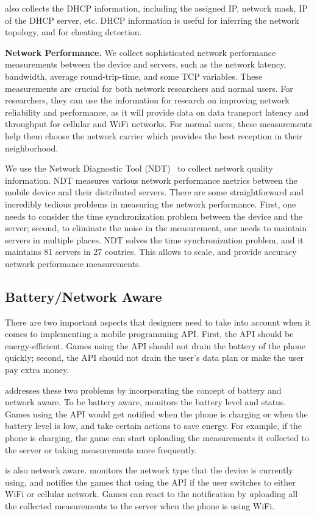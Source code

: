 \name{} also collects the DHCP information, including the assigned IP, network mask, IP of the DHCP server, etc.
DHCP information is useful for inferring the network topology, and for cheating detection.
 
 
{\bfseries Network Performance.} We collect sophisticated network performance measurements between the device
and servers, such as the network latency, bandwidth, average round-trip-time, and some TCP variables. These
measurements are crucial for both network researchers and normal users. For researchers, they can use the 
information for research on improving network reliability and performance, as it will provide data on data 
transport latency and throughput for cellular and WiFi networks. For normal users, these measurements help them
choose the network carrier which provides the best reception in their neighborhood. 

We use the Network Diagnostic Tool (NDT)~\cite{NDT} to collect network quality information. NDT measures various network 
performance metrics between the mobile device and their distributed servers. There are some straightforward 
and incredibly tedious problems in measuring the network performance. First, one needs to consider the time 
synchronization problem between the device and the server; second, to eliminate the noise in the measurement, 
one needs to maintain servers in multiple places. 
NDT solves the time synchronization problem, and it maintains 81 servers in 27 coutries. This allows \name{}
to scale, and provide accuracy network performance measurements.

\subsection{Battery/Network Aware}
There are two important aspects that designers need to take into account when it comes to 
implementing a mobile programming API. First, the API should be energy-efficient. 
Games using the API should not drain the battery of the phone quickly; second, the API should
not drain the user's data plan or make the user pay extra money. 
 
\name{} addresses these two problems by incorporating the concept of battery and network aware. 
To be battery aware, \name{} monitors the battery level and status. Games using the API would get
notified when the phone is charging or when the battery level is low, and take certain actions
to save energy. For example, if the phone is charging, the game can start uploading the measurements 
it collected to the server or taking measurements more frequently. 

\name{} is also network aware. \name{} monitors the network type that the device is currently using, 
and notifies the games that using the API if the user switches to either WiFi or cellular network.
Games can react to the notification by uploading all the collected measurements to the server when
the phone is using WiFi.

